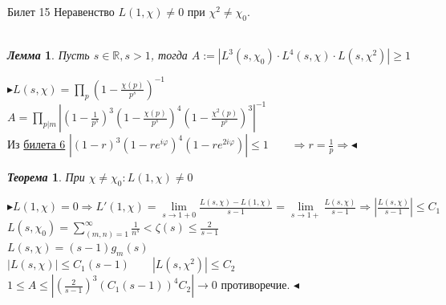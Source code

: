 \documentclass[a4paper,12pt]{article}
\newtheorem{teo}{\textit{Теорема}}
\newtheorem{lem}{\textit{Лемма}}
\newcommand{\FI}{\varphi}
\newcommand{\q}{\quad}
\newcommand{\pb}{\blacktriangleright}
\newcommand{\pe}{\blacktriangleleft}
\newcommand{\Ra}{\Rightarrow}
\newcommand{\bb}[1]{\mathbb{#1}}
\newcommand{\SL}{\sum\limits}
\newcommand{\os}{\left(}
\newcommand{\cs}{\right)}
\begin{document}
\newpage
\begin{mybox}{\hypertarget{bil15}{Билет 15}}
Неравенство $L(1,\chi)\not=0$ при $\chi^2\not=\chi_0$.\\\q\\
\begin{lem} Пусть $s\in \bb{R}, s > 1$, тогда $A:= |L^3(s,\chi_0)\cdot L^4(s,\chi)\cdot L(s, \chi^2)| \ge 1$
\end{lem}
$\pb L(s, \chi) = \prod\limits_p \os 1 - \frac{\chi(p)}{p^s} \cs ^{-1} $\\
$A = \prod\limits_{p|m} \left|\os 1 - \frac{1}{p^s} \cs^3  \os 1 - \frac{\chi(p)}{p^s} \cs^4  \os 1 - \frac{\chi^2(p)}{p^s} \cs^3  \right|^{-1}   $\\
Из \hyperlink{bil6}{билета 6} $|(1-r)^3 (1-re^{i\varphi})^4 (1 - re^{2i\FI})| \le 1 \q\q\Ra r = \frac{1}{p}\Ra \pe$

\begin{teo} При $\chi \not= \chi_0: L(1,\chi)\not=0$
\end{teo}
$\pb L(1,\chi) = 0\Ra L'(1,\chi) = \lim\limits_{s\to1+0} \frac{L(s,\chi) - L(1,\chi)}{s-1} = \lim\limits_{s\to1+}\frac{L(s,\chi)}{s-1}\Ra \left| \frac{L(s,\chi)}{s-1} \right| \le C_1$\\
$L(s, \chi_0) = \SL_{(m,n) = 1}^\infty \frac{1}{n^s} < \zeta(s) \le \frac{2}{s-1} $\\
$L(s,\chi) = (s-1)g_m(s) $\\
$|L(s,\chi)| \le C_1(s-1)\q\q |L(s,\chi^2)| \le C_2$\\
$1 \le A\le \left| \os  \frac{2}{s-1} \cs^3 (C_1 (s-1))^4 C_2  \right| \to 0$ противоречие. $\pe$

\end{mybox}
\end{document}
